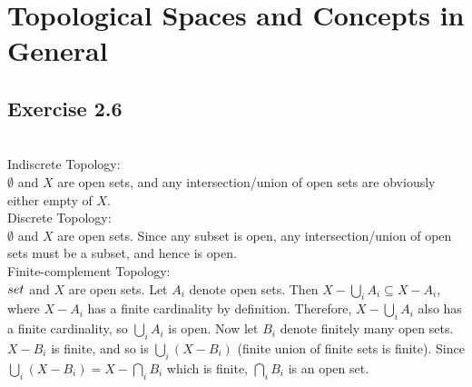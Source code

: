 \newpage

\section{Topological Spaces and Concepts in General}

\subsection{Exercise 2.6}
\setcounter{question}{0}


\begin{solution}
 \\Indiscrete Topology: \\
 $\emptyset$ and $X$ are open sets, and any intersection/union of open sets are obviously either empty of $X$. \\
 Discrete Topology: \\
 $\emptyset$ and $X$ are open sets. Since any subset is open, any intersection/union of open sets must be a subset, and hence is open. \\
 Finite-complement Topology: \\
 $\empty set$ and $X$ are open sets. Let $A_i$ denote open sets. Then $X - \bigcup_i A_i \subseteq X - A_i$, where $X - A_i$ has a finite cardinality by definition. Therefore, $X - \bigcup_i A_i$ also has a finite cardinality, so $\bigcup_i A_i$ is open. Now let $B_i$ denote finitely many open sets. $X-B_i$ is finite, and so is $\bigcup_i (X - B_i)$ (finite union of finite sets is finite). Since $\bigcup_i (X - B_i) = X - \bigcap_i B_i$ which is finite, $\bigcap_i B_i$ is an open set.
\end{solution}

\question


